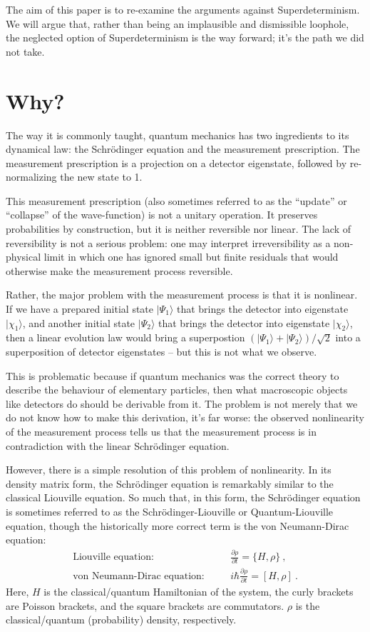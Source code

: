 \documentclass[12pt]{article}
\def\beqn{\begin{eqnarray}}
\def\eeqn{\end{eqnarray}}
\begin{document}
The aim of this paper is to re-examine the arguments against Superdeterminism. We will argue that, rather than being an implausible and dismissible loophole, the neglected option of Superdeterminism is the way forward; it's the path we did not take. 

\section{Why?}

The way it is commonly taught, quantum mechanics has two ingredients to its dynamical law: the Schr\"odinger equation and the measurement prescription. The measurement prescription is a projection on a detector eigenstate, followed by re-normalizing the new state to 1. 

This measurement prescription (also sometimes referred to as the ``update'' or ``collapse'' of the wave-function) is not a unitary operation. It preserves probabilities by construction, but it is neither reversible nor linear. The lack of reversibility is not a serious problem: one may interpret irreversibility as a non-physical limit in which one has ignored small but finite residuals that would otherwise make the measurement process reversible. 

Rather, the major problem with the measurement process is that it is nonlinear. If we have a prepared initial state $|\Psi_1 \rangle$ that brings the detector into eigenstate $|\chi_1 \rangle$, and another initial state $|\Psi_2 \rangle$ that brings the detector into eigenstate $|\chi_2 \rangle$, then a linear evolution law would bring a superpostion $(|\Psi_1 \rangle + |\Psi_2 \rangle)/\sqrt{2}$ into a superposition of detector eigenstates -- but this is not what we observe. 

This is problematic because if quantum mechanics was the correct theory to describe the behaviour of elementary particles, then what macroscopic objects like detectors do should be derivable from it. The problem is not merely that we do not know how to make this derivation, it's far worse: the observed nonlinearity of the measurement process tells us that the measurement process is in contradiction with the linear Schr\"odinger equation.

However, there is a simple resolution of this problem of nonlinearity. In its density matrix form, the Schr\"{o}dinger equation is remarkably similar to the classical Liouville equation. So much that, in this form, the Schr\"{o}dinger equation is sometimes referred to as the Schr\"{o}dinger-Liouville or Quantum-Liouville equation, though the historically more correct term is the von Neumann-Dirac equation:
\beqn
\mbox{Liouville equation:} &\quad& \frac{\partial \rho}{\partial t} = \{ H, \rho \}~,\\
\mbox{von Neumann-Dirac equation:} &\quad& i \hbar \frac{\partial \rho}{\partial t} = \left[ H, \rho \right] ~. 
\eeqn 
Here, $H$ is the classical/quantum Hamiltonian of the system, the curly brackets are Poisson brackets, and the square brackets are commutators. $\rho$ is the classical/quantum (probability) density, respectively.
\end{document}
